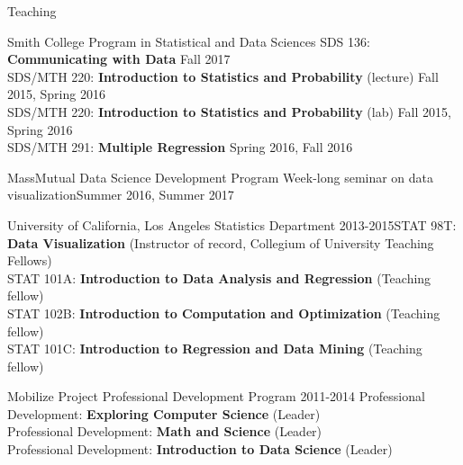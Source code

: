 \documentclass{resume} %
\begin{document}
\clearpage

\begin{rSection}{Teaching}

\begin{reSubsection}{Smith College }{ Program in Statistical and Data Sciences }{}{
SDS 136: \textbf{Communicating with Data} \hfill Fall 2017 \\
SDS/MTH 220: \textbf{Introduction to Statistics and Probability} (lecture) \hfill Fall 2015, Spring 2016 \\
SDS/MTH 220: \textbf{Introduction to Statistics and Probability} (lab) \hfill Fall 2015, Spring 2016 \\
SDS/MTH 291: \textbf{Multiple Regression} \hfill Spring 2016, Fall 2016\\}
\end{reSubsection}

\begin{reSubsection}{MassMutual }{ Data Science Development Program }{}{
Week-long seminar on data visualization\hfill Summer 2016, Summer 2017\\}
\end{reSubsection}

\begin{reSubsection}{University of California, Los Angeles }{ Statistics Department }{2013-2015}{STAT 98T: \textbf{Data Visualization }(Instructor of record, Collegium of University Teaching Fellows) \\
STAT 101A: \textbf{Introduction to Data Analysis and Regression} (Teaching fellow) \\
STAT 102B: \textbf{Introduction to Computation and Optimization} (Teaching fellow) \\
STAT 101C: \textbf{Introduction to Regression and Data Mining} (Teaching fellow) \\
}
\end{reSubsection}

\begin{reSubsection}{Mobilize Project }{ Professional Development Program }{2011-2014}{
 Professional Development: \textbf{Exploring Computer Science} (Leader) \\
 Professional Development: \textbf{Math and Science} (Leader) \\
Professional Development: \textbf{Introduction to Data Science} (Leader) \\
}
\end{reSubsection}
\end{rSection}
\end{document}

